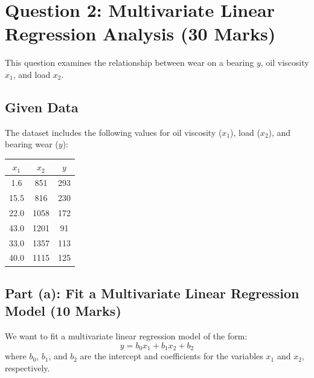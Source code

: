 \documentclass{article}
\begin{document}
	\newpage
	\section*{Question 2: Multivariate Linear Regression Analysis (30 Marks)}
	This question examines the relationship between wear on a bearing \( y \), oil viscosity \( x_1 \), and load \( x_2 \).
	
	\subsection*{Given Data}
	The dataset includes the following values for oil viscosity (\( x_1 \)), load (\( x_2 \)), and bearing wear (\( y \)):
	
	\begin{center}
		\begin{tabular}{|c|c|c|}
			\hline
			\( x_1 \) & \( x_2 \) & \( y \) \\
			\hline
			1.6 & 851 & 293 \\
			15.5 & 816 & 230 \\
			22.0 & 1058 & 172 \\
			43.0 & 1201 & 91 \\
			33.0 & 1357 & 113 \\
			40.0 & 1115 & 125 \\
			\hline
		\end{tabular}
	\end{center}
	
	
	\subsection*{Part (a): Fit a Multivariate Linear Regression Model (10 Marks)}
	We want to fit a multivariate linear regression model of the form:
	\[
	y = b_0 x_1 + b_1 x_2 + b_2
	\]
	where \( b_0 \), \( b_1 \), and \( b_2 \) are the intercept and coefficients for the variables \( x_1 \) and \( x_2 \), respectively.
	
\end{document}
